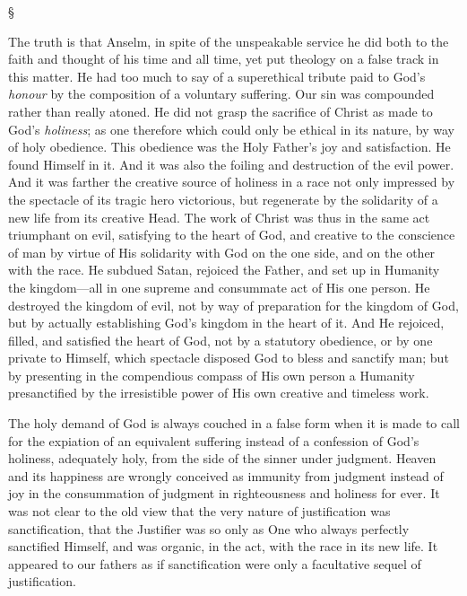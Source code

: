 \documentclass[12pt,letterpaper,oneside]{book}
\begin{document}
\begin{center}
\S
\end{center}

The truth is that Anselm, in spite of the 
unspeakable service he did both to the faith 
and thought of his time and all time, yet put 
theology on a false track in this matter. He 
had too much to say of a superethical tribute 
paid to God's \textit{honour} by the composition of a 
voluntary suffering. Our sin was compounded 
rather than really atoned. He did not grasp the 
sacrifice of Christ as made to God's \textit{holiness}; as 
one therefore which could only be ethical in its 
nature, by way of holy obedience. This obedience 
was the Holy Father's joy and satisfaction. He 
found Himself in it. And it was also the foiling 
and destruction of the evil power. And it was 
farther the creative source of holiness in a race 
not only impressed by the spectacle of its tragic 
hero victorious, but regenerate by the solidarity 
of a new life from its creative Head. The work 
of Christ was thus in the same act triumphant 
on evil, satisfying to the heart of God, and 
creative to the conscience of man by virtue of 
His solidarity with God on the one side, and on 
the other with the race. He subdued Satan, 
rejoiced the Father, and set up in Humanity the 
kingdom---all in one supreme and consummate 
act of His one person. He destroyed the kingdom 
of evil, not by way of preparation for the 
kingdom of God, but by actually establishing 
God's kingdom in the heart of it. And He rejoiced, 
filled, and satisfied the heart of God, not 
by a statutory obedience, or by one private to 
Himself, which spectacle disposed God to bless 
and sanctify man; but by presenting in the 
compendious compass of His own person a 
Humanity presanctified by the irresistible 
power of His own creative and timeless work. 

The holy demand of God is always couched in 
a false form when it is made to call for the 
expiation of an equivalent suffering instead of a 
confession of God's holiness, adequately holy, 
from the side of the sinner under judgment. 
Heaven and its happiness are wrongly conceived 
as immunity from judgment instead of joy in 
the consummation of judgment in righteousness 
and holiness for ever. It was not clear to the 
old view that the very nature of justification 
was sanctification, that the Justifier was so only 
as One who always perfectly sanctified Himself, 
and was organic, in the act, with the race in its 
new life. It appeared to our fathers as if sanctification 
were only a facultative sequel of justification. 
\end{document}
